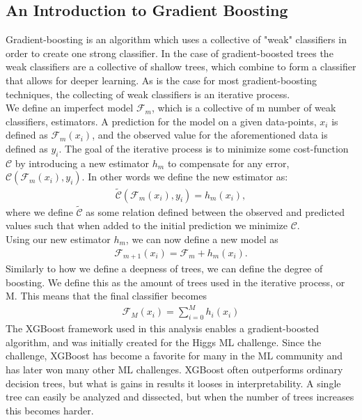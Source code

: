 \subsection{An Introduction to Gradient Boosting}
Gradient-boosting is an algorithm which uses a collective of "weak" 
classifiers in order to create one strong classifier. In the case of gradient-boosted 
trees the weak classifiers are a collective of shallow trees, which combine to form a classifier 
that allows for deeper learning. As is the case for most gradient-boosting 
techniques, the collecting of weak classifiers is an iterative process.
\\
We define an imperfect model $\mathcal{F}_m$, which is a collective of m number of weak 
classifiers, estimators. A prediction for the model on a given data-points, $x_i$ is 
defined as $\mathcal{F}_m(x_i)$, and the observed value for the aforementioned data is 
defined as $y_i$. The goal of the iterative process is to minimize some cost-function 
$\mathcal{C}$ by introducing a new estimator $h_m$ to compensate for any error, 
$\mathcal{C}(\mathcal{F}_m(x_i), y_i)$. In other words we define the new estimator as:
\begin{align}
    \tilde{\mathcal{C}}(\mathcal{F}_m(x_i), y_i) = h_m(x_i),
\end{align}
where we define $\tilde{\mathcal{C}}$ as some relation defined between the observed and 
predicted values such that when added to the initial prediction we minimize $\mathcal{C}$.
\\
Using our new estimator $h_m$, we can now define a new model as
\begin{align}
    \mathcal{F}_{m+1}(x_i) = \mathcal{F}_m + h_m (x_i).
\end{align}
Similarly to how we define a deepness of trees, we can define the degree of boosting. We define 
this as the amount of trees used in the iterative process, or M. This means that the final classifier 
becomes
\begin{align}
    \mathcal{F}_M (x_i) = \sum_{i=0}^M h_i(x_i)
\end{align} 
The XGBoost \cite{XGB} framework used in this analysis enables a gradient-boosted algorithm, 
and was initially created for the Higgs ML challenge. Since the challenge, XGBoost has become 
a favorite for many in the ML community and has later won many other ML challenges. XGBoost 
often outperforms ordinary decision trees, but what is gains in results it looses in 
interpretability. A single tree can easily be analyzed and dissected, but when the number 
of trees increases this becomes harder. 
